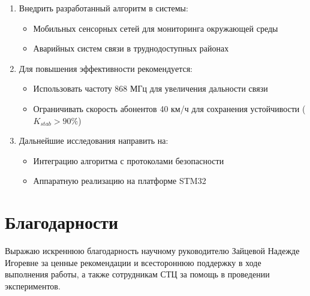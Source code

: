 \begin{enumerate}
    \item Внедрить разработанный алгоритм в системы:
    \begin{itemize}
        \item Мобильных сенсорных сетей для мониторинга окружающей среды
        \item Аварийных систем связи в труднодоступных районах
    \end{itemize}

    \item Для повышения эффективности рекомендуется:
    \begin{itemize}
        \item Использовать частоту 868 МГц для увеличения дальности связи
        \item Ограничивать скорость абонентов 40 км/ч для сохранения устойчивости ($K_{stab} > 90\%$)
    \end{itemize}

    \item Дальнейшие исследования направить на:
    \begin{itemize}
        \item Интеграцию алгоритма с протоколами безопасности
        \item Аппаратную реализацию на платформе STM32
    \end{itemize}
\end{enumerate}

\section*{Благодарности}
Выражаю искреннюю благодарность научному руководителю Зайцевой Надежде Игоревне за ценные рекомендации и всестороннюю поддержку в ходе выполнения работы, а также сотрудникам СТЦ за помощь в проведении экспериментов.
